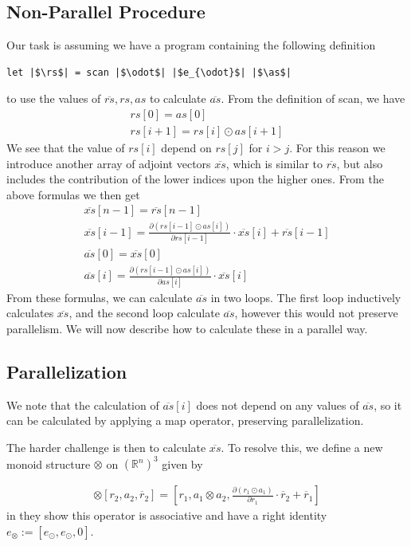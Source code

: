 \documentclass{article}
\newcommand{\ors}{\overline{rs}}
\newcommand{\rs}{rs}
\newcommand{\oas}{\overline{as}}
\newcommand{\xo}{\overline{xs}}
\newcommand{\as}{as}
\begin{document}
\subsection{Non-Parallel Procedure}
Our task is assuming we have a program containing the following definition
\begin{verbatim}
let |$\rs$| = scan |$\odot$| |$e_{\odot}$| |$\as$|
\end{verbatim}
to use the values of
\(\ors, \rs, \as\) to calculate \(\oas\).
From the definition of scan, we have
\begin{align*}
	\rs[0] = \as[0] \\
	\rs [i+1] = \rs[i] \odot \as[i+1]
\end{align*}
We see that the value of \(\rs[i]\) depend on \(\rs[j]\) for \(i>j\).
For this reason we introduce another array of adjoint vectors \(\xo\),
which is similar to \(\ors\), but also includes the contribution of the lower
indices upon the higher ones.
From the above formulas we then get
\begin{align*}
	\xo [n-1] = \ors [n-1]     \\
	\xo [i-1] = \frac{\partial (\rs [i-1] \odot \as[i])}{\partial \rs[i-1]}
	\cdot \xo[i]   + \ors[i-1] \\
	\oas [0] = \xo[0]          \\
	\oas [i] = \frac{\partial (\rs [i-1] \odot \as[i])}{\partial \as[i]}
	\cdot
	\xo[i]
\end{align*}
From these formulas, we can calculate \(\oas\) in two loops.
The first loop inductively calculates \(\xo\),
and the second loop calculate \(\oas\),
however this would not preserve parallelism. We will now describe how to
calculate these in a parallel way.
\subsection{Parallelization}
We note that the calculation of \(\oas[i]\) does not depend on any values of
\(\oas\),
so it can be calculated by applying a map operator,
preserving parallelization.

The harder challenge is then to calculate \(\xo\).
To resolve this,
we define a new monoid structure \(\otimes\) on \((\mathbb{R}^{n})^{3}\)
given by

\begin{align*}
	[r_{1}, a_{1}, \overline{r}_{1}] \otimes
	[r_{2}, a_{2}, \overline{r}_{2}] =
	\left[r_{1}, a_{1} \otimes a_{2},
		\frac{\partial (r_{1} \odot a_{1})}{\partial r_{1}} \cdot \overline{r}_{2} + \overline{r}_{1} \right]
\end{align*}
in \cite{PPAD} they show this operator is associative and have a right
identity \(e_{\otimes} :=[e_{\odot}, e_{\odot}, 0]\).
\end{document}
